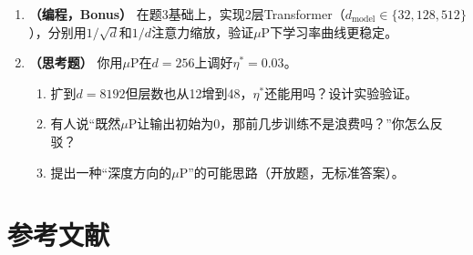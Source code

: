 \documentclass[11pt,a4paper]{article}
\begin{document}
\begin{enumerate}[leftmargin=*,label=\textbf{题\arabic*.}]
\item \textbf{（编程，Bonus）} 在题3基础上，实现2层Transformer（$d_{\text{model}}\in\{32,128,512\}$），分别用$1/\sqrt{d}$和$1/d$注意力缩放，验证$\mu$P下学习率曲线更稳定。

\item \textbf{（思考题）} 你用$\mu$P在$d=256$上调好$\eta^*=0.03$。
\begin{enumerate}[label=(\alph*)]
\item 扩到$d=8192$但层数也从12增到48，$\eta^*$还能用吗？设计实验验证。
\item 有人说``既然$\mu$P让输出初始为0，那前几步训练不是浪费吗？''你怎么反驳？
\item 提出一种``深度方向的$\mu$P''的可能思路（开放题，无标准答案）。
\end{enumerate}
\end{enumerate}

\section*{参考文献}
\end{document}
